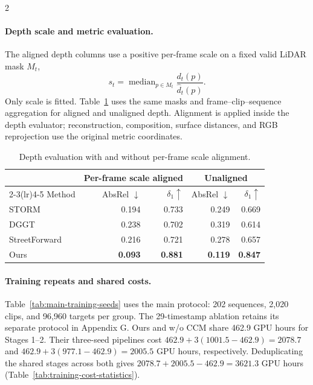 \begin{multicols}{2}

\paragraph{Depth scale and metric evaluation.}
The aligned depth columns use a positive per-frame scale on a fixed valid LiDAR mask $M_t$,
\begin{equation}
s_t=\operatorname{median}_{p\in M_t}\frac{d_t(p)}{\widehat d_t(p)}.
\label{eq:depth-alignment}
\end{equation}
Only scale is fitted. Table~\ref{tab:depth-scale} uses the same masks and frame--clip--sequence aggregation for aligned and unaligned depth. Alignment is applied inside the depth evaluator; reconstruction, composition, surface distances, and RGB reprojection use the original metric coordinates.

\begin{table}[H]
\centering\small
\caption{Depth evaluation with and without per-frame scale alignment.}
\label{tab:depth-scale}
\begin{tabular}{@{}lrrrr@{}}
\toprule
& \multicolumn{2}{c}{Per-frame scale aligned} & \multicolumn{2}{c}{Unaligned} \\
\cmidrule(lr){2-3}\cmidrule(lr){4-5}
Method & AbsRel $\downarrow$ & $\delta_1\uparrow$ & AbsRel $\downarrow$ & $\delta_1\uparrow$ \\
\midrule
STORM & 0.194 & 0.733 & 0.249 & 0.669 \\
DGGT & 0.238 & 0.702 & 0.319 & 0.614 \\
StreetForward & 0.216 & 0.721 & 0.278 & 0.657 \\
Ours & \textbf{0.093} & \textbf{0.881} & \textbf{0.119} & \textbf{0.847} \\
\bottomrule
\end{tabular}
\end{table}

\paragraph{Training repeats and shared costs.}
Table~\ref{tab:main-training-seeds} uses the main protocol: 202 sequences, 2,020 clips, and 96,960 targets per group. The 29-timestamp ablation retains its separate protocol in Appendix G. Ours and w/o CCM share 462.9 GPU hours for Stages 1--2. Their three-seed pipelines cost $462.9+3(1001.5-462.9)=2078.7$ and $462.9+3(977.1-462.9)=2005.5$ GPU hours, respectively. Deduplicating the shared stages across both gives $2078.7+2005.5-462.9=3621.3$ GPU hours (Table~\ref{tab:training-cost-statistics}).


\end{multicols}
